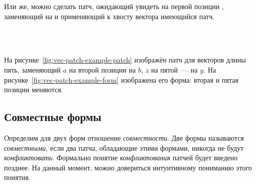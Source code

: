 Или же, можно сделать патч, ожидающий увидеть на первой позиции
, заменяющий  на  и
применяющий к хвосту вектора имеющийся патч.

\begin{code}%
\>[2]\<[4]%
\>[4] \AgdaSymbol{:}  \AgdaSymbol{\{}\AgdaSymbol{\}\{} \AgdaSymbol{:}  \AgdaSymbol{\}}\<%
\\
\>[4]\<[6]%
\>[6] \AgdaSymbol{(}  \AgdaSymbol{:} \AgdaSymbol{)}\<%
\\
\>[4]\<[6]%
\>[6]     \AgdaSymbol{(}  \AgdaSymbol{)}\<%
\end{code}

На рисунке~\ref{fig:vec-patch-example-patch} изображён патч для
векторов длины пять, заменяющий $a$ на второй позиции на $b$, $z$ на
пятой~--- на $y$. На рисунке~\ref{fig:vec-patch-example-form}
изображена его форма: вторая и пятая позиции меняются.

\subsection{Совместные формы}

Определим для двух форм отношение \emph{совместности}. Две формы
называются \emph{совместными}, если два патча, обладающие этими
формами, никогда не будут \emph{конфликтовать}. Формально понятие
\emph{конфликтования} патчей будет введено позднее. На данный момент,
можно довериться интуитивному пониманию этого понятия.

